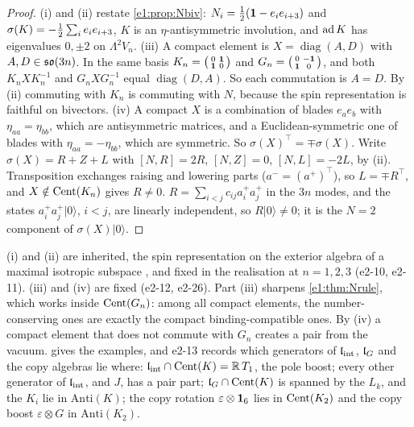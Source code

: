 \begin{proof}
(i) and (ii) restate \cref{e1:prop:Nbiv}: $N_i=\tfrac12(\mathbf 1-e_ie_{i+3})$ and $\sigma(K)=-\tfrac12\sum_ie_ie_{i+3}$, $K$ is an $\eta$-antisymmetric involution,
and $\operatorname{ad} K$ has eigenvalues $0,\pm2$ on $\Lambda^2V_n$. (iii) A compact element is $X=\operatorname{diag}(A,D)$ with $A,D\in\mathfrak{so}(3n)$. In the same
basis $K_n=\bigl(\begin{smallmatrix}0&\mathbf 1\\\mathbf 1&0\end{smallmatrix}\bigr)$ and $G_n=\bigl(\begin{smallmatrix}0&-\mathbf 1\\\mathbf 1&0\end{smallmatrix}\bigr)$, and
both $K_nXK_n^{-1}$ and $G_nXG_n^{-1}$ equal $\operatorname{diag}(D,A)$. So each commutation is $A=D$. By (ii) commuting with $K_n$ is
commuting with $N$, because the spin representation is faithful on bivectors. (iv) A compact $X$ is a combination of blades $e_ae_b$ with
$\eta_{aa}=\eta_{bb}$, which are antisymmetric matrices, and a Euclidean-symmetric one of blades with $\eta_{aa}=-\eta_{bb}$, which are symmetric. So
$\sigma(X)^{\!\top}=\mp\sigma(X)$. Write $\sigma(X)=R+Z+L$ with $[N,R]=2R$, $[N,Z]=0$, $[N,L]=-2L$, by (ii). Transposition exchanges raising and
lowering parts ($a^-=(a^+)^{\!\top}$), so $L=\mp R^{\!\top}$, and $X\notin\operatorname{Cent}(K_n)$ gives $R\neq0$. $R=\sum_{i<j}c_{ij}a^+_ia^+_j$ in the $3n$ modes,
and the states $a^+_ia^+_j|0\rangle$, $i<j$, are linearly independent, so $R|0\rangle\neq0$; it is the $N=2$ component of $\sigma(X)|0\rangle$.
\end{proof}

(i) and (ii) are inherited, the spin representation on the exterior algebra of a maximal isotropic subspace \cite{Chevalley54}, and fixed
in the realisation at $n=1,2,3$ (e2-10, e2-11). (iii) and (iv) are fixed (e2-12, e2-26). Part (iii) sharpens \cref{e1:thm:Nrule}, which works
inside $\operatorname{Cent}(G_n)$: among all compact elements, the number-conserving ones are exactly the compact binding-compatible ones. By (iv) a
compact element that does not commute with $G_n$ creates a pair from the vacuum.  gives the examples, and
e2-13 records which generators of $\mathfrak l_{\rm int}$, $\mathfrak l_G$ and the copy algebras lie where: $\mathfrak l_{\rm int}\cap\operatorname{Cent}(K)=\mathbb{R}\,T_1$, the pole boost; every
other generator of $\mathfrak l_{\rm int}$, and $J$, has a pair part; $\mathfrak l_G\cap\operatorname{Cent}(K)$ is spanned by the $L_k$, and the $K_i$ lie in $\mathrm{Anti}(K)$; the copy
rotation $\varepsilon\otimes\mathbf 1_6$ lies in $\operatorname{Cent}(K_2)$ and the copy boost $\varepsilon\otimes G$ in $\mathrm{Anti}(K_2)$.

